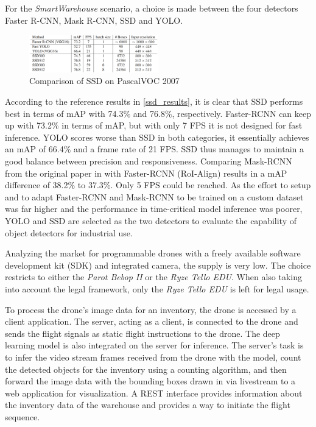 \documentclass[a4paper, 10pt, journal]{wissarbIEEE}      %
\begin{document}
For the \textit{SmartWarehouse} scenario, a choice is made between the four detectors Faster R-CNN, Mask R-CNN, SSD and YOLO. 

\begin{figure}[h]
	\centering
	\includegraphics[width=0.5\textwidth]{fig/ssd_results.png}
	\caption{Comparison of SSD on PascalVOC 2007 \cite{WeiLiuDragomirAnguelovDumitruErhanChristianSzegedyScottReedChengYangFuAlexander.2016}}
	\label{ssd_results}
\end{figure}

According to the reference results in \autoref{ssd_results}, it is clear that SSD performs best in terms of mAP with 74.3\% and 76.8\%, respectively. Faster-RCNN can keep up with 73.2\% in terms of mAP, but with only 7 FPS it is not designed for fast inference. YOLO scores worse than SSD in both categories, it essentially achieves an mAP of 66.4\% and a frame rate of 21 FPS. SSD thus manages to maintain a good balance between precision and responsiveness. Comparing Mask-RCNN from the original paper in \cite{KaimingHeGeorgiaGkioxariPiotrDollarRossGirshick.2018} with Faster-RCNN (RoI-Align) results in a mAP difference of 38.2\% to 37.3\%. Only 5 FPS could be reached. As the effort to setup and to adapt Faster-RCNN and Mask-RCNN to be trained on a custom dataset was far higher and the performance in time-critical model inference was poorer, YOLO and SSD are selected as the two detectors to evaluate the capability of object detectors for industrial use.

Analyzing the market for programmable drones with a freely available software development kit (SDK) and integrated camera, the supply is very low. The choice restricts to either the \textit{Parot Bebop II} or the \textit{Ryze Tello EDU}. When also taking into account the legal framework, only the \textit{Ryze Tello EDU} is left for legal usage.

To process the drone's image data for an inventory, the drone is accessed by a client application. The server, acting as a client, is connected to the drone and sends the flight signals as static flight instructions to the drone. The deep learning model is also integrated on the server for inference. The server's task is to infer the video stream frames received from the drone with the model, count the detected objects for the inventory using a counting algorithm, and then forward the image data with the bounding boxes drawn in via livestream to a web application for visualization. A REST interface provides information about the inventory data of the warehouse and provides a way to initiate the flight sequence.
\end{document}
